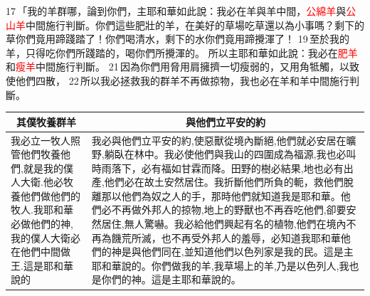 17 「我的羊群哪，論到你們，主耶和華如此說：我必在羊與羊中間，\textcolor{red}{公綿羊}與\textcolor{red}{公山羊}中間施行判斷。你們這些肥壯的羊，在美好的草場吃草還以為小事嗎？剩下的草你們竟用蹄踐踏了！你們喝清水，剩下的水你們竟用蹄攪渾了！ 19 至於我的羊，只得吃你們所踐踏的，喝你們所攪渾的。
所以主耶和華如此說：我必在\textcolor{red}{肥羊}和\textcolor{red}{瘦羊}中間施行判斷。 21 因為你們用脅用肩擁擠一切瘦弱的，又用角牴觸，以致使他們四散， 22 所以我必拯救我的群羊不再做掠物，我也必在羊和羊中間施行判斷。 

\begin{table}[H]
\centering
\begin{tabular}{p{3.25cm}|p{14.50cm}}\hline\hline
\multicolumn{1}{c|}{其僕牧養群羊}&\multicolumn{1}{c}{與他們立平安的約}\\\hline
\multirow{2}{3.6cm}{我必立一牧人照管他們牧養他們,就是我的僕人大衛.他必牧養他們做他們的牧人.我耶和華必做他們的神,我的僕人大衛必在他們中間做王.這是耶和華說的}
&我必與他們立平安的約,使惡獸從境內斷絕,他們就必安居在曠野,躺臥在林中。我必使他們與我山的四圍成為福源,我也必叫時雨落下，必有福如甘霖而降。田野的樹必結果,地也必有出產,他們必在故土安然居住。我折斷他們所負的軛，救他們脫離那以他們為奴之人的手，那時他們就知道我是耶和華。他們必不再做外邦人的掠物,地上的野獸也不再吞吃他們,卻要安然居住,無人驚嚇。我必給他們興起有名的植物,他們在境內不再為饑荒所滅，也不再受外邦人的羞辱，必知道我耶和華他們的神是與他們同在,並知道他們以色列家是我的民。這是主耶和華說的。你們做我的羊,我草場上的羊,乃是以色列人,我也是你們的神。這是主耶和華說的。\\\hline
\end{tabular}
\end{table}
 



